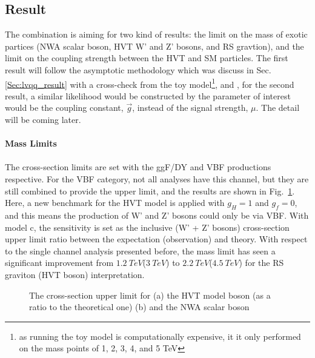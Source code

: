\subsection{Result}
The combination is aiming for two kind of results: the limit on the mass of exotic partices (NWA scalar boson, HVT W' and Z' bosons, and RS gravtion), and the limit on the coupling strength between the HVT and SM particles. The first result will follow the asymptotic methodology which was discuss in Sec.\ref{Sec:lvqq_result} with a cross-check from the toy model\footnote{as running the toy model is computationally expensive, it it only performed on the mass points of 1, 2, 3, 4, and 5 TeV}, and , for the second result, a similar likelihood would be constructed by the parameter of interest would be the coupling constant, $\vec{g}$, instead of the signal strength, $\mu$. The detail will be coming later. 
\\
\\{\bf Mass Limits}
\\
\\The cross-section limits are set with the ggF/DY and VBF productions respective. For the VBF category, not all analyses have this channel, but they are still combined to provide the upper limit, and the results are shown in Fig.~\ref{Fig:limit_VBF_comb}. Here, a new benchmark for the HVT model is applied with $g_{H}=1$ and $g_{f}=0$, and this means the production of W' and Z' bosons could only be via VBF. With model c, the sensitivity is set as the inclusive (W' + Z' bosons) cross-section upper limit ratio between the expectation (observation) and theory. With respect to the single channel analysis presented before, the mass limit has seen a significant improvement from $1.2~TeV$($3~TeV$) to $2.2~TeV$($4.5~TeV$) for the RS graviton (HVT boson) interpretation.   
\begin{figure}[ht]
	\centering
	\caption{The cross-section upper limit for (a) the HVT model boson (as a ratio to the theoretical one) (b) and the NWA scalar boson }
	\label{Fig:limit_VBF_comb}
\end{figure}
